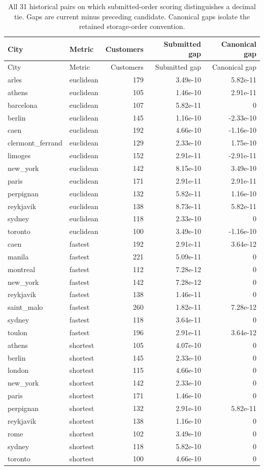 \begin{longtable}{llrrr}
\caption{All 31 historical pairs on which submitted-order scoring distinguishes a decimal tie. Gaps are current minus preceding candidate. Canonical gaps isolate the retained storage-order convention.}\\
\toprule
City & Metric & Customers & Submitted gap & Canonical gap\\
\midrule
\endfirsthead
\toprule
City & Metric & Customers & Submitted gap & Canonical gap\\
\midrule
\endhead
\bottomrule
\endfoot
arles & euclidean & 179 & 3.49e-10 & 5.82e-11 \\
athens & euclidean & 105 & 1.46e-10 & 2.91e-11 \\
barcelona & euclidean & 107 & 5.82e-11 & 0 \\
berlin & euclidean & 145 & 1.16e-10 & -2.33e-10 \\
caen & euclidean & 192 & 4.66e-10 & -1.16e-10 \\
clermont\_ferrand & euclidean & 129 & 2.33e-10 & 1.75e-10 \\
limoges & euclidean & 152 & 2.91e-11 & -2.91e-11 \\
new\_york & euclidean & 142 & 8.15e-10 & 3.49e-10 \\
paris & euclidean & 171 & 2.91e-11 & 2.91e-11 \\
perpignan & euclidean & 132 & 5.82e-11 & 1.16e-10 \\
reykjavik & euclidean & 138 & 8.73e-11 & 5.82e-11 \\
sydney & euclidean & 118 & 2.33e-10 & 0 \\
toronto & euclidean & 100 & 3.49e-10 & -1.16e-10 \\
caen & fastest & 192 & 2.91e-11 & 3.64e-12 \\
manila & fastest & 221 & 5.09e-11 & 0 \\
montreal & fastest & 112 & 7.28e-12 & 0 \\
new\_york & fastest & 142 & 7.28e-12 & 0 \\
reykjavik & fastest & 138 & 1.46e-11 & 0 \\
saint\_malo & fastest & 260 & 1.82e-11 & 7.28e-12 \\
sydney & fastest & 118 & 3.64e-11 & 0 \\
toulon & fastest & 196 & 2.91e-11 & 3.64e-12 \\
athens & shortest & 105 & 4.07e-10 & 0 \\
berlin & shortest & 145 & 2.33e-10 & 0 \\
london & shortest & 115 & 4.66e-10 & 0 \\
new\_york & shortest & 142 & 2.33e-10 & 0 \\
paris & shortest & 171 & 1.46e-10 & 0 \\
perpignan & shortest & 132 & 2.91e-10 & 5.82e-11 \\
reykjavik & shortest & 138 & 1.16e-10 & 0 \\
rome & shortest & 102 & 3.49e-10 & 0 \\
sydney & shortest & 118 & 5.82e-10 & 0 \\
toronto & shortest & 100 & 4.66e-10 & 0 \\
\end{longtable}
